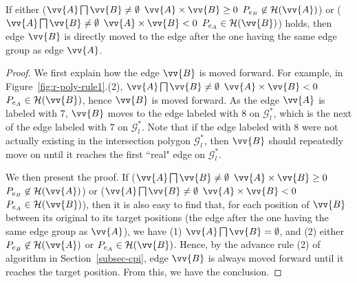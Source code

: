 
\begin{prop}
\label{prop-rule2}
If either ($\vv{A} \bigsqcap \vv{B} \ne \emptyset$ \And $\vv{A} \times \vv{B} \ge 0$ \And $P_{e_B} \not \in \mathcal{H}(\vv{A})$) or ($\vv{A} \bigsqcap \vv{B} \ne \emptyset$ \And $\vv{A} \times \vv{B} < 0$ \And $P_{e_A} \in \mathcal{H}(\vv{B})$) holds, then edge $\vv{B}$ is directly moved to the edge after the one having the same edge group as edge $\vv{A}$.
\end{prop}

\begin{proof}
We first explain how the edge $\vv{B}$ is moved forward.
For example, in Figure~\ref{fig:r-poly-rule1}.(2), $\vv{A} \bigsqcap \vv{B} \ne \emptyset$ \And $\vv{A} \times \vv{B} < 0$ \And $P_{e_A} \in \mathcal{H}(\vv{B})$, hence $\vv{B}$ is moved forward. As the edge $\vv{A}$ is labeled with 7,
$\vv{B}$ moves to the edge labeled with 8 on $\mathcal{G}^*_{l}$, which is the next of the edge labeled with 7 on $\mathcal{G}^*_{l}$.
Note that if the edge labeled with 8 were not actually existing in the intersection polygon $\mathcal{G}^*_{l}$, then $\vv{B}$ should repeatedly move on until it reaches the first ``real" edge on $\mathcal{G}^*_{l}$.

We then present the proof.
If ($\vv{A} \bigsqcap \vv{B} \ne \emptyset$ \And $\vv{A} \times \vv{B} \ge 0$ \And $P_{e_B} \not \in \mathcal{H}(\vv{A})$) or ($\vv{A} \bigsqcap \vv{B} \ne \emptyset$ \And $\vv{A} \times \vv{B} < 0$ \And $P_{e_A} \in \mathcal{H}(\vv{B})$), then it is also easy to find that, for each position of $\vv{B}$ between its original to its target positions (\ie the edge after the one having the same edge group as $\vv{A}$), we have (1) $\vv{A} \bigsqcap \vv{B} = \emptyset$, and (2) either $P_{e_B} \not \in \mathcal{H}(\vv{A})$ or $P_{e_A} \in \mathcal{H}(\vv{B})$. Hence, by the advance rule (2) of algorithm \cpia in Section~\ref{subsec-cpi}, edge $\vv{B}$ is always moved forward until it reaches the target position. From this, we have the conclusion.
\end{proof}







